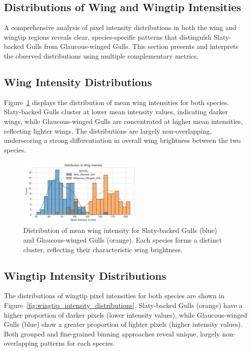 \documentclass[a4paper,12pt]{report}
\begin{document}
\subsection{Distributions of Wing and Wingtip Intensities}

A comprehensive analysis of pixel intensity distributions in both the wing and wingtip regions reveals clear, species-specific patterns that distinguish Slaty-backed Gulls from Glaucous-winged Gulls. This section presents and interprets the observed distributions using multiple complementary metrics.

\subsection{Wing Intensity Distributions}

Figure~\ref{fig:wing_intensity_distribution} displays the distribution of mean wing intensities for both species. Slaty-backed Gulls cluster at lower mean intensity values, indicating darker wings, while Glaucous-winged Gulls are concentrated at higher mean intensities, reflecting lighter wings. The distributions are largely non-overlapping, underscoring a strong differentiation in overall wing brightness between the two species.

\begin{figure}[H]
    \centering
    \includegraphics[width=0.55\textwidth]{images/REPORT_IMAGES_INTENSITY/I2/distribution.png}
    \caption{Distribution of mean wing intensity for Slaty-backed Gulls (blue) and Glaucous-winged Gulls (orange). Each species forms a distinct cluster, reflecting their characteristic wing brightness.}
    \label{fig:wing_intensity_distribution}
\end{figure}


\subsection{Wingtip Intensity Distributions}

The distributions of wingtip pixel intensities for both species are shown in Figure~\ref{fig:wingtip_intensity_distributions}. Slaty-backed Gulls (orange) have a higher proportion of darker pixels (lower intensity values), while Glaucous-winged Gulls (blue) show a greater proportion of lighter pixels (higher intensity values). Both grouped and fine-grained binning approaches reveal unique, largely non-overlapping patterns for each species.
\end{document}
